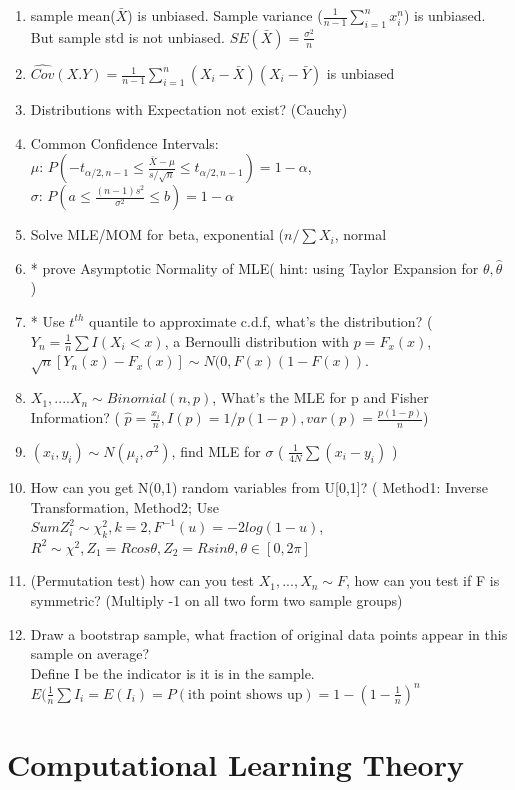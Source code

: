 \documentclass[11pt, openany]{book}              %
\begin{document}
\begin{enumerate}
    \item sample mean($\bar{X}$) is unbiased. Sample variance ($\frac{1}{n-1}\sum_{i=1}^n x_i^n$) is unbiased. But sample std is not unbiased. $SE(\bar{X})=\frac{\sigma^2}{n}$
    \item $\hat{Cov}(X.Y) = \frac{1}{n-1} \sum_{i=1}^n(X_i-\bar{X})(X_i-\bar{Y})$ is unbiased
    \item Distributions with Expectation not exist? (Cauchy) 
    \item Common Confidence Intervals:\\ $\mu$: $P(-t_{\alpha/2, n-1} \leq \frac{\bar{X}-\mu}{s/\sqrt{n}} \leq t_{\alpha/2, n-1})= 1- \alpha$, \\$\sigma$: $P(a \leq \frac{(n-1)s^2}{\sigma^2} \leq b)= 1-\alpha$
    \item Solve MLE/MOM for beta, exponential ($n/\sum{X_i}$, normal 
    \item * prove Asymptotic Normality of MLE( hint: using Taylor Expansion for $\theta, \hat{\theta}$ )
    \item * Use $t^{th}$ quantile to approximate c.d.f, what's the distribution? ($Y_n=\frac{1}{n} \sum I(X_i <x)$, a Bernoulli distribution with $p=F_x(x)$, $\sqrt{n}[Y_n(x) - F_x(x)] \sim N(0, F(x)(1-F(x))$.
 	\item $X_1, .... X_n \sim Binomial(n,p)$, What's the MLE for p and Fisher Information? ( $\hat{p}= \frac{x_i}{n}, I(p) = 1/p(1-p), var(p) = \frac{p(1-p)}{n}$)
 	\item $(x_i,y_i) \sim N(\mu_i, \sigma^2)$, find MLE for $\sigma$ ( $\frac{1}{4N} \sum(x_i-y_i)$ )
 	\item How can you get N(0,1) random variables from U[0,1]? ( Method1: Inverse Transformation, Method2; Use $Sum Z_i^2 \sim \chi_k^2, k = 2, F^{-1}(u) = -2log(1-u)$, $R^2 \sim \chi^2, Z_1 = Rcos\theta, Z_2 = Rsin\theta, \theta \in [0, 2\pi]$
 	\item (Permutation test) how can you test $X_1,...,X_n \sim F$, how can you test if F is symmetric? (Multiply -1 on all two form two sample groups)
 	\item Draw a bootstrap sample, what fraction of original data points appear in this sample on average?  
 	\\ Define I be the indicator is it is in the sample. $E(\frac{1}{n}\sum I_i= E(I_i) = P(\text{ith point shows up})= 1- (1-\frac{1}{n})^n$
\end{enumerate}

\chapter{Computational Learning Theory}
\end{document}

